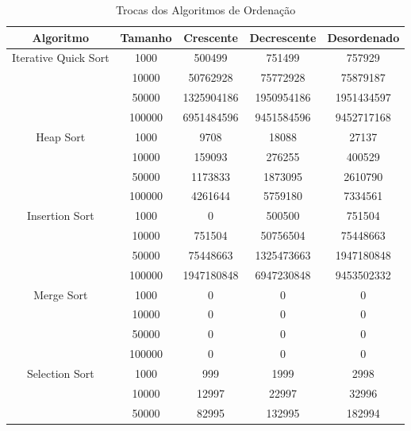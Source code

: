 \documentclass[12pt,a4paper]{article}
\begin{document}
\begin{table}[H]
    \centering
    \caption{Trocas dos Algoritmos de Ordenação}
    \label{tab:trocas}
    \begin{tabular}{@{}ccccc@{}}
        \toprule
        Algoritmo         & Tamanho & Crescente & Decrescente & Desordenado \\ \midrule
        Iterative Quick Sort & 1000    & 500499    & 751499      & 757929      \\
                            & 10000   & 50762928  & 75772928    & 75879187    \\
                            & 50000   & 1325904186 & 1950954186  & 1951434597  \\
                            & 100000  & 6951484596 & 9451584596  & 9452717168  \\ \midrule
        Heap Sort            & 1000    & 9708      & 18088       & 27137       \\
                            & 10000   & 159093    & 276255      & 400529      \\
                            & 50000   & 1173833   & 1873095     & 2610790     \\
                            & 100000  & 4261644   & 5759180     & 7334561     \\ \midrule
        Insertion Sort       & 1000    & 0         & 500500      & 751504      \\
                            & 10000   & 751504    & 50756504    & 75448663    \\
                            & 50000   & 75448663  & 1325473663  & 1947180848  \\
                            & 100000  & 1947180848 & 6947230848  & 9453502332  \\ \midrule
        Merge Sort           & 1000    & 0         & 0           & 0           \\
                            & 10000   & 0         & 0           & 0           \\
                            & 50000   & 0         & 0           & 0           \\
                            & 100000  & 0         & 0           & 0           \\ \midrule
        Selection Sort       & 1000    & 999       & 1999        & 2998        \\
                            & 10000   & 12997     & 22997       & 32996       \\
                            & 50000   & 82995     & 132995      & 182994      \\

\end{tabular}
\end{table}
\end{document}
